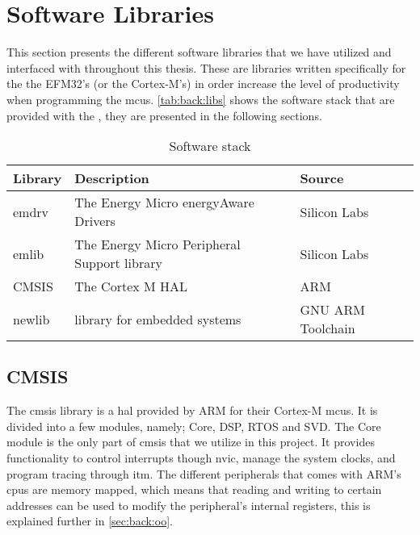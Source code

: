 
\section{Software Libraries}
\label{sec:back:lib}

This section presents the different software libraries that we have utilized and interfaced with throughout this thesis.
These are libraries written specifically for the the EFM32's (or the Cortex-M's) in order increase the level of productivity when programming the \glspl{mcu}.
\autoref{tab:back:libs} shows the software stack that are provided with the {\gecko}, they are presented in the following sections.

\begin{table}[H]
  \begin{tabular}{l|l|l}
    \textbf{Library} & \textbf{Description} & \textbf{Source} \\
    \hline
    emdrv & The Energy Micro energyAware Drivers & Silicon Labs \\
    emlib & The Energy Micro Peripheral Support library & Silicon Labs \\
    CMSIS & The Cortex M HAL & ARM \\
    newlib & {\C} library for embedded systems & GNU ARM Toolchain \\
    \hline
  \end{tabular}
  \caption{Software stack}
  \label{tab:back:libs}
\end{table}

\subsection{CMSIS}
\label{sub:cmsis}

The \gls{cmsis} library is a \gls{hal} provided by ARM for their Cortex-M \glspl{mcu}.
It is divided into a few modules, namely; Core, DSP, RTOS and SVD.
The Core module is the only part of \gls{cmsis} that we utilize in this project.
It provides functionality to control interrupts though \gls{nvic}, manage the system clocks, and program tracing through \gls{itm}.
The different peripherals that comes with ARM's \glspl{cpu} are memory mapped, which means that reading and writing to certain addresses can be used to modify the peripheral's internal registers, this is explained further in \autoref{sec:back:oo}.


